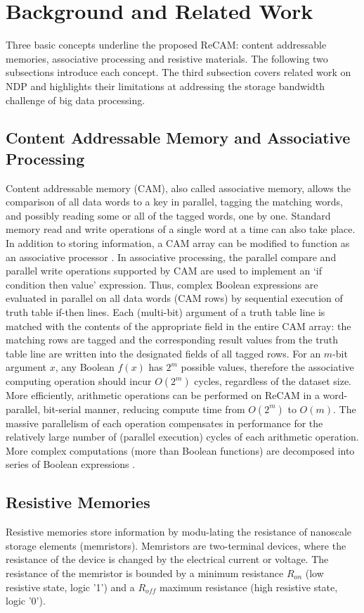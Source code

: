 \documentclass{superfri}
\begin{document}
\section{Background and Related Work}
\label{sec:backgroud}
Three basic concepts underline the proposed ReCAM: content addressable memories, associative processing and resistive materials. The following two subsections introduce each concept. The third subsection covers related work on NDP and highlights their limitations at addressing the storage bandwidth challenge of big data processing.

\subsection{Content Addressable Memory and Associative Processing}
\label{sec:CAMandAP}
Content addressable memory (CAM), also called associative memory, allows the comparison of all data words to a key in parallel, tagging the matching words, and possibly reading some or all of the tagged words, one by one. Standard memory read and write operations of a single word at a time can also take place.
In addition to storing information, a CAM array can be modified to function as an associative processor \cite{foster1976content}\cite{yavits2015resistive}. In associative processing, the parallel compare and parallel write operations supported by CAM are used to implement an ‘if condition then value' expression. Thus, complex Boolean expressions are evaluated in parallel on all data words (CAM rows) by sequential execution of truth table if-then lines. Each (multi-bit) argument of a truth table line is matched with the contents of the appropriate field in the entire CAM array: the matching rows are tagged and the corresponding result values from the truth table line are written into the designated fields of all tagged rows. 
For an $m$-bit argument $x$, any Boolean $f(x)$ has $2^m$ possible values, therefore the associative computing operation should incur $O(2^m)$ cycles, regardless of the dataset size. More efficiently, arithmetic operations can be performed on ReCAM in a word-parallel, bit-serial manner, reducing compute time from $O(2^m)$ to $O(m)$. The massive parallelism of each operation compensates in performance for the relatively large number of (parallel execution) cycles of each arithmetic operation.
More complex computations (more than Boolean functions) are decomposed into series of Boolean expressions \cite{foster1976content}\cite{yavits2015resistive}. 

\subsection{Resistive Memories}
\label{sec:resistive_memories}
Resistive memories store information by modu-lating the resistance of nanoscale storage elements (memristors). Memristors are two-terminal devices, where the resistance of the device is changed by the electrical current or voltage. The resistance of the memristor is bounded by a minimum resistance $R_{on}$ (low resistive state, logic '1') and a $R_{off}$ maximum resistance (high resistive state, logic '0').
\end{document}
